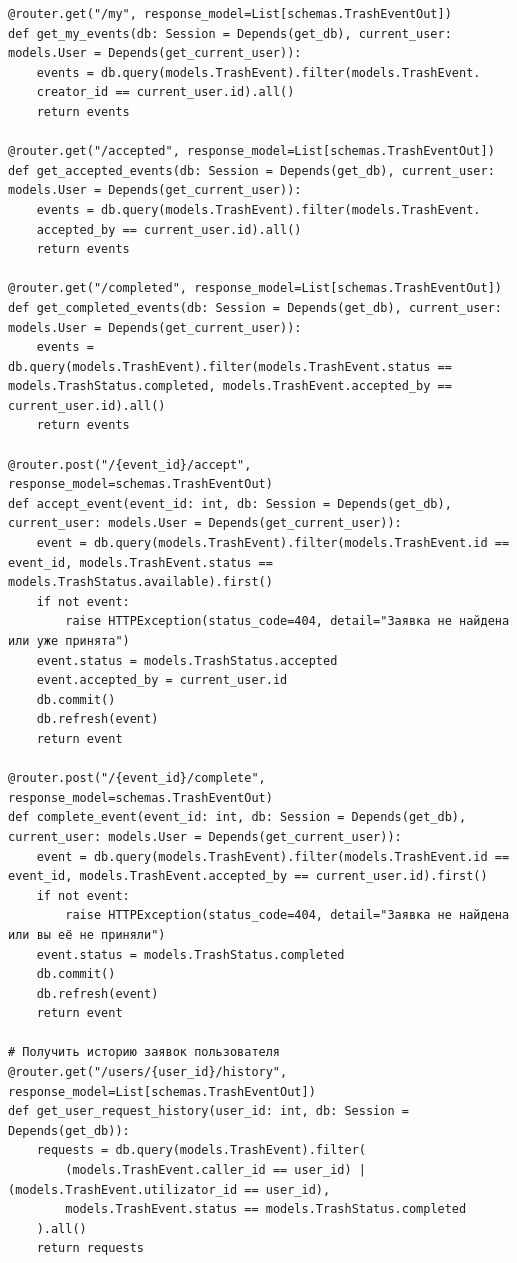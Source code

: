 \documentclass[coursework]{SCWorks}
\begin{document}
\begin{verbatim}
@router.get("/my", response_model=List[schemas.TrashEventOut])
def get_my_events(db: Session = Depends(get_db), current_user: models.User = Depends(get_current_user)):
    events = db.query(models.TrashEvent).filter(models.TrashEvent.
    creator_id == current_user.id).all()
    return events

@router.get("/accepted", response_model=List[schemas.TrashEventOut])
def get_accepted_events(db: Session = Depends(get_db), current_user: models.User = Depends(get_current_user)):
    events = db.query(models.TrashEvent).filter(models.TrashEvent.
    accepted_by == current_user.id).all()
    return events

@router.get("/completed", response_model=List[schemas.TrashEventOut])
def get_completed_events(db: Session = Depends(get_db), current_user: models.User = Depends(get_current_user)):
    events = db.query(models.TrashEvent).filter(models.TrashEvent.status == models.TrashStatus.completed, models.TrashEvent.accepted_by == current_user.id).all()
    return events

@router.post("/{event_id}/accept", response_model=schemas.TrashEventOut)
def accept_event(event_id: int, db: Session = Depends(get_db), current_user: models.User = Depends(get_current_user)):
    event = db.query(models.TrashEvent).filter(models.TrashEvent.id == event_id, models.TrashEvent.status == models.TrashStatus.available).first()
    if not event:
        raise HTTPException(status_code=404, detail="Заявка не найдена или уже принята")
    event.status = models.TrashStatus.accepted
    event.accepted_by = current_user.id
    db.commit()
    db.refresh(event)
    return event

@router.post("/{event_id}/complete", response_model=schemas.TrashEventOut)
def complete_event(event_id: int, db: Session = Depends(get_db), current_user: models.User = Depends(get_current_user)):
    event = db.query(models.TrashEvent).filter(models.TrashEvent.id == event_id, models.TrashEvent.accepted_by == current_user.id).first()
    if not event:
        raise HTTPException(status_code=404, detail="Заявка не найдена или вы её не приняли")
    event.status = models.TrashStatus.completed
    db.commit()
    db.refresh(event)
    return event

# Получить историю заявок пользователя
@router.get("/users/{user_id}/history", response_model=List[schemas.TrashEventOut])
def get_user_request_history(user_id: int, db: Session = Depends(get_db)):
    requests = db.query(models.TrashEvent).filter(
        (models.TrashEvent.caller_id == user_id) | (models.TrashEvent.utilizator_id == user_id),
        models.TrashEvent.status == models.TrashStatus.completed
    ).all()
    return requests
\end{verbatim}
\end{document}

